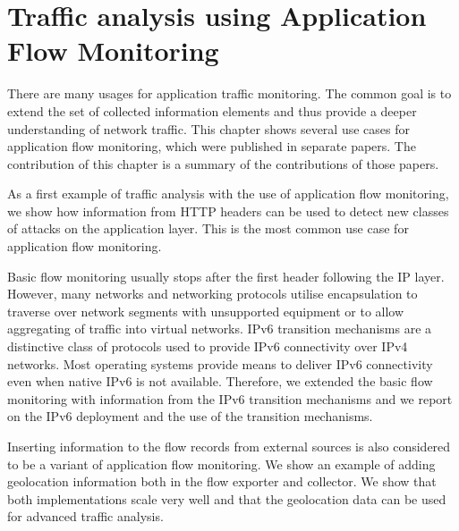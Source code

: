 \chapter{Traffic analysis using Application Flow Monitoring}\label{chap:traffic-analysis-using-application-flow-monitoring}

\begin{chapintro}

There are many usages for application traffic monitoring. The common goal is to extend the set of collected information elements and thus provide a deeper understanding of network traffic. This chapter shows several use cases for application flow monitoring, which were published in separate papers. The contribution of this chapter is a summary of the contributions of those papers.

As a first example of traffic analysis with the use of application flow monitoring, we show how information from HTTP headers can be used to detect new classes of attacks on the application layer. This is the most common use case for application flow monitoring. 


Basic flow monitoring usually stops after the first header following the IP layer. However, many networks and networking protocols utilise encapsulation to traverse over network segments with unsupported equipment or to allow aggregating of traffic into virtual networks. IPv6 transition mechanisms are a distinctive class of protocols used to provide IPv6 connectivity over IPv4 networks. Most operating systems provide means to deliver IPv6 connectivity even when native IPv6 is not available. Therefore, we extended the basic flow monitoring with information from the IPv6 transition mechanisms and we report on the IPv6 deployment and the use of the transition mechanisms.

Inserting information to the flow records from external sources is also considered to be a variant of application flow monitoring. We show an example of adding geolocation information both in the flow exporter and collector. We show that both implementations scale very well and that the geolocation data can be used for advanced traffic analysis.


\end{chapintro}
